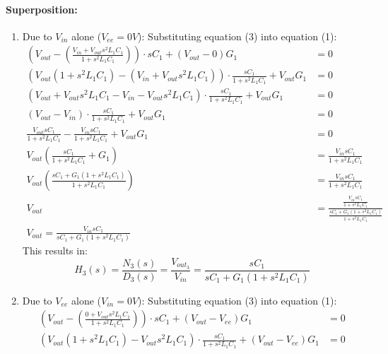 \begin{enumerate}
    \paragraph{Superposition:}
      \begin{enumerate}
        \item Due to \(V_{in}\) alone (\(V_{ee} = 0V\)):
          Substituting equation (3) into equation (1):
          \begin{align*}
            \left(V_{out} - \left(\frac{V_{in} + V_{out}s^2 L_1 C_1}{1 + s^2 L_1 C_1}\right)\right) \cdot sC_1 + (V_{out} - 0){G_1} &= 0 \\
            \left(V_{out}(1 + s^2 L_1 C_1) - (V_{in} + V_{out}s^2 L_1 C_1)\right) \cdot \frac{sC_1}{1 + s^2 L_1 C_1} + V_{out}G_1 &= 0 \\
            \left(V_{out} + V_{out}s^2 L_1 C_1 - V_{in} - V_{out}s^2 L_1 C_1\right) \cdot \frac{sC_1}{1 + s^2 L_1 C_1} + V_{out}G_1 &= 0 \\
            \left(V_{out} - V_{in}\right) \cdot \frac{sC_1}{1 + s^2 L_1 C_1} + V_{out}G_1 &= 0 \\
            \frac{V_{out} sC_1}{1 + s^2 L_1 C_1} - \frac{V_{in} sC_1}{1 + s^2 L_1 C_1} + V_{out}G_1 &= 0 \\
            V_{out}\left(\frac{sC_1}{1 + s^2 L_1 C_1} + G_1\right) &= \frac{V_{in} sC_1}{1 + s^2 L_1 C_1} \\
            V_{out}\left(\frac{sC_1 + G_1(1 + s^2 L_1 C_1)}{1 + s^2 L_1 C_1}\right) &= \frac{V_{in} sC_1}{1 + s^2 L_1 C_1} \\
            V_{out} &= \frac{\frac{V_{in} sC_1}{1 + s^2 L_1 C_1}}{\frac{sC_1 + G_1(1 + s^2 L_1 C_1)}{1 + s^2 L_1 C_1}} \\
            V_{out} = \frac{V_{in} sC_1}{sC_1 + G_1(1 + s^2 L_1 C_1)}
          \end{align*}
          This results in:
          \[
            \boxed{H_3(s) = \frac{N_3(s)}{D_3(s)} = \frac{V_{out_3}}{V_{in}} = \frac{sC_1}{sC_1 + G_1(1 + s^2 L_1 C_1)}}
          \]
        \item Due to \(V_{ee}\) alone (\(V_{in} = 0V\)):
          Substituting equation (3) into equation (1):
          \begin{align*}
            \left(V_{out} - \left(\frac{0 + V_{out}s^2 L_1 C_1}{1 + s^2 L_1 C_1}\right)\right) \cdot sC_1 + (V_{out} - V_{ee}){G_1} &= 0 \\
            \left(V_{out}(1 + s^2 L_1 C_1) - V_{out}s^2 L_1 C_1\right) \cdot \frac{sC_1}{1 + s^2 L_1 C_1} + (V_{out} - V_{ee}){G_1} &= 0 \\

\end{align*}
\end{enumerate}
\end{enumerate}
